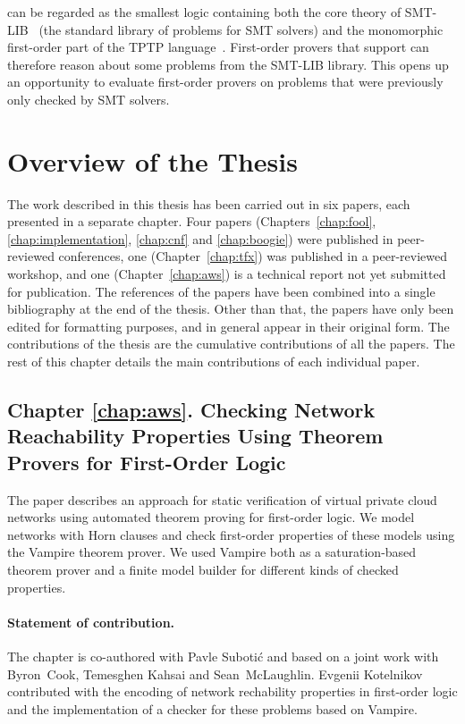 \folb{} can be regarded as the smallest logic containing both the core theory of SMT-LIB~\cite{SMT-LIB} (the standard library of problems for SMT solvers) and the monomorphic first-order part of the TPTP language~\cite{tff0}. First-order provers that support \folb{} can therefore reason about some problems from the SMT-LIB library. This opens up an opportunity to evaluate first-order provers on problems that were previously only checked by SMT solvers.

\section*{Overview of the Thesis}
\label{sect:intro:overview}

The work described in this thesis has been carried out in six papers, each presented in a separate chapter. Four papers (Chapters~\ref{chap:fool}, \ref{chap:implementation}, \ref{chap:cnf} and \ref{chap:boogie}) were published in peer-reviewed conferences, one (Chapter~\ref{chap:tfx}) was published in a peer-reviewed workshop, and one (Chapter~\ref{chap:aws}) is a technical report not yet submitted for publication. The references of the papers have been combined into a single bibliography at the end of the thesis. Other than that, the papers have only been edited for formatting purposes, and in general appear in their original form. The contributions of the thesis are the cumulative contributions of all the papers. The rest of this chapter details the main contributions of each individual paper.

\subsection*{Chapter \ref{chap:aws}. Checking Network Reachability Properties Using Theorem Provers for First-Order Logic}
The paper describes an approach for static verification of virtual private cloud networks using automated theorem proving for first-order logic. We model networks with Horn clauses and check first-order properties of these models using the Vampire theorem prover. We used Vampire both as a saturation-based theorem prover and a finite model builder for different kinds of checked properties.

\paragraph{Statement of contribution.} The chapter is co-authored with Pavle Suboti\'{c} and based on a joint work with Byron~Cook, Temesghen Kahsai and Sean~McLaughlin. Evgenii Kotelnikov contributed with the encoding of network rechability properties in first-order logic and the implementation of a checker for these problems based on Vampire.

